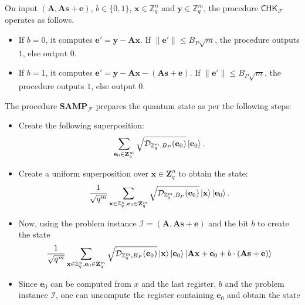 \begin{defn}
\begin{enumerate}
    On input $(\mathbf{A},\mathbf{A}\mathbf{s}
    +\mathbf{e})$, $b\in\{0,1\}$, $\mathbf{x}\in \mathbb{Z}^n_q$ and $\mathbf{y}\in \mathbb{Z}^m_q$, the procedure $\mathsf{CHK}_{\mathcal{F}}$ operates as follows.
    \begin{itemize}
        \item If $b=0$, it computes $\mathbf{e}'=\mathbf{y}-\mathbf{A} \mathbf{x}$. If $\|\mathbf{e}'\|\leq B_P\sqrt{m}$, the procedure outputs $1$, else output $0$.
        \item If $b=1$, it computes $\mathbf{e}'=\mathbf{y}-\mathbf{A}\mathbf{x} -(\mathbf{A}\mathbf{s}+\mathbf{e})$. If $\|\mathbf{e}'\|\leq B_P\sqrt{m}$, the procedure outputs $1$, else output $0$.
    \end{itemize}

    The procedure $\mathbf{SAMP}_{\mathcal{F}}$ prepares the quantum state as per the following steps:
    \begin{itemize}
        \item Create the following superposition:
        \begin{align}
            \sum_{\mathbf{e}_0\in\mathbf{Z}^m_q} \sqrt{\mathcal{D}_{\mathbb{Z}^m_q,B_P}(\mathbf{e}_0)}\ket{\mathbf{e}_0}.
        \end{align}
        \item Create a uniform superposition over $\mathbf{x}\in\mathbf{Z}^n_q$ to obtain the state:
        \begin{align}
            \frac{1}{\sqrt{q^m}}\sum_{\mathbf{x}\in\mathbb{Z}^n_q,\mathbf{e}_0\in\mathbf{Z}^m_q} \sqrt{\mathcal{D}_{\mathbb{Z}^m_q,B_P}(\mathbf{e}_0)}\ket{\mathbf{x}}\ket{\mathbf{e}_0}.
        \end{align}
        \item Now, using the problem instance $\mathcal{I}=(\mathbf{A},\mathbf{A}\mathbf{s}+\mathbf{e})$ and the bit $b$ to create the state
        \begin{align}
            \frac{1}{\sqrt{q^m}}\sum_{\mathbf{x}\in\mathbb{Z}^n_q,\mathbf{e}_0\in\mathbf{Z}^m_q} \sqrt{\mathcal{D}_{\mathbb{Z}^m_q,B_P}(\mathbf{e}_0)}\ket{\mathbf{x}}\ket{\mathbf{e}_0}\ket{\mathbf{A}\mathbf{x}+\mathbf{e}_0+b\cdot (\mathbf{A}\mathbf{s}+\mathbf{e})}  
        \end{align}
        \item Since $\mathbf{e}_0$ can be computed from $x$ and the last register, $b$ and the problem instance $\mathcal{I}$, one can uncompute the register containing $\mathbf{e}_0$ and obtain the state
        \begin{align}

\end{align}
\end{itemize}
\end{enumerate}
\end{defn}
